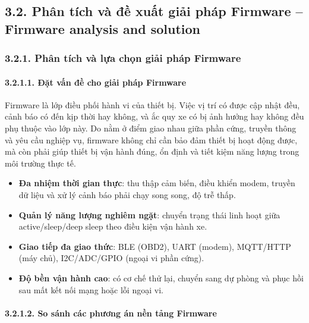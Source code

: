 \documentclass[a4paper]{extarticle}
\providecommand{\tightlist}{%
  \setlength{\itemsep}{0pt}\setlength{\parskip}{0pt}}
\begin{document}
\subsection{3.2. Phân tích và đề xuất giải pháp Firmware -- Firmware
analysis and solution}\label{32-ux111ux1ec1-xuux1ea5t-cuxe1c-giux1ea3i-phuxe1p--proposed-solutions}

\subsubsection{3.2.1. Phân tích và lựa chọn giải pháp Firmware}

\paragraph{3.2.1.1. Đặt vấn đề cho giải pháp
Firmware}\label{3121-ux111ux1eb7t-vux1ea5n-ux111ux1ec1-cho-giux1ea3i-phuxe1p-firmware}

Firmware là lớp điều phối hành vi của thiết bị. Việc vị trí có được cập
nhật đều, cảnh báo có đến kịp thời hay không, và ắc quy xe có bị ảnh
hưởng hay không đều phụ thuộc vào lớp này. Do nằm ở điểm giao nhau giữa
phần cứng, truyền thông và yêu cầu nghiệp vụ, firmware không chỉ cần bảo
đảm thiết bị hoạt động được, mà còn phải giúp thiết bị vận hành đúng,
ổn định và tiết kiệm năng lượng trong môi trường thực tế.

\begin{itemize}
\tightlist
\item
  \textbf{Đa nhiệm thời gian thực}: thu thập cảm biến, điều khiển modem,
  truyền dữ liệu và xử lý cảnh báo phải chạy song song, độ trễ thấp.
\item
  \textbf{Quản lý năng lượng nghiêm ngặt}: chuyển trạng thái linh hoạt
  giữa active/sleep/deep sleep theo điều kiện vận hành xe.
\item
  \textbf{Giao tiếp đa giao thức}: BLE (OBD2), UART (modem), MQTT/HTTP
  (máy chủ), I2C/ADC/GPIO (ngoại vi phần cứng).
\item
  \textbf{Độ bền vận hành cao}: có cơ chế thử lại, chuyển sang dự phòng và phục hồi
  sau mất kết nối mạng hoặc lỗi ngoại vi.
\end{itemize}

\paragraph{3.2.1.2. So sánh các phương án nền tảng
Firmware}\label{3122-so-suxe1nh-cuxe1c-phux1b0ux1a1ng-uxe1n-nux1ec1n-tux1ea3ng-firmware}
\end{document}

